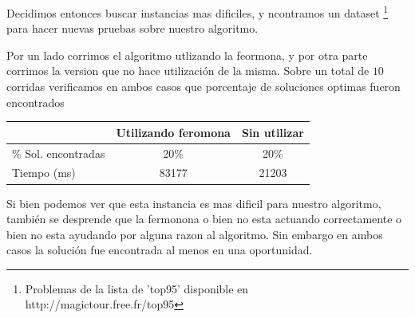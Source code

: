 Decidimos entonces buscar instancias mas dificiles, y ncontramos un dataset \footnote{Problemas de la lista de 'top95' disponible en http://magictour.free.fr/top95} 
para hacer nuevas pruebas sobre nuestro algoritmo.

Por un lado corrimos el algoritmo utlizando la feormona, y por otra parte corrimos la version que no hace utilización  de 
la misma. Sobre un total de $10$ corridas verificamos en ambos casos que 
porcentaje de soluciones optimas fueron encontrados

\begin{center}
  \begin{tabular}{ | l | c | c |}
    \hline
     & Utilizando feromona & Sin utilizar \\  \hline
     \% Sol. encontradas & 20\% & 20\% \\ \hline
    Tiempo (ms) & 83177 & 21203 \\
    \hline
  \end{tabular}
\end{center}

Si bien podemos ver que esta instancia es mas dificil para nuestro algoritmo, 
también se desprende que la fermonona o bien no esta actuando correctamente o 
bien no esta ayudando por alguna razon al algoritmo. Sin embargo en ambos casos 
la solución fue encontrada al menos en una oportunidad. 


\newpage























